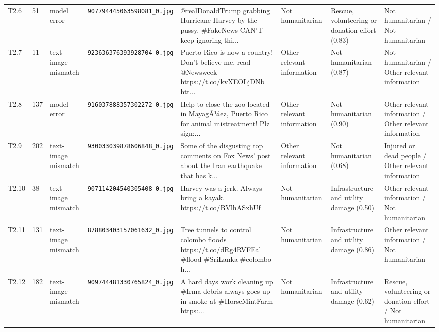 \begin{table}[t]
\begin{tabular}{llllp{4.4cm}p{2.1cm}p{2.5cm}p{2.3cm}}
T2.6 & 51 & model error & \texttt{907794445063598081\_0.jpg} & @realDonaldTrump grabbing Hurricane Harvey by the pussy. \#FakeNews CAN'T keep ignoring thi... & Not humanitarian & Rescue, volunteering or donation effort (0.83) & Not humanitarian / Not humanitarian \\
T2.7 & 11 & text-image mismatch & \texttt{923636376393928704\_0.jpg} & Puerto Rico is now a country! Don't believe me, read @Newsweek https://t.co/kvXEOLjDNb htt... & Other relevant information & Not humanitarian (0.87) & Not humanitarian / Other relevant information \\
T2.8 & 137 & model error & \texttt{916037888357302272\_0.jpg} & Help to close the zoo located in MayagÃ¼ez, Puerto Rico for animal mistreatment! Plz sign:... & Other relevant information & Not humanitarian (0.90) & Other relevant information / Other relevant information \\
T2.9 & 202 & text-image mismatch & \texttt{930033039878606848\_0.jpg} & Some of the disgusting top comments on Fox News' post about the Iran earthquake that has k... & Other relevant information & Not humanitarian (0.68) & Injured or dead people / Other relevant information \\
T2.10 & 38 & text-image mismatch & \texttt{907114204540305408\_0.jpg} & Harvey was a jerk. Always bring a kayak. https://t.co/BVlhASxhUf & Not humanitarian & Infrastructure and utility damage (0.50) & Other relevant information / Not humanitarian \\
T2.11 & 131 & text-image mismatch & \texttt{878803403157061632\_0.jpg} & Tree tunnels to control colombo floods https://t.co/dRg4RVFEal \#flood \#SriLanka \#colombo h... & Not humanitarian & Infrastructure and utility damage (0.86) & Other relevant information / Not humanitarian \\
T2.12 & 182 & text-image mismatch & \texttt{909744481330765824\_0.jpg} & A hard days work cleaning up \#Irma debris always goes up in smoke at \#HorseMintFarm https:... & Not humanitarian & Infrastructure and utility damage (0.62) & Rescue, volunteering or donation effort / Not humanitarian \\
\bottomrule
\end{tabular}
\end{table}
